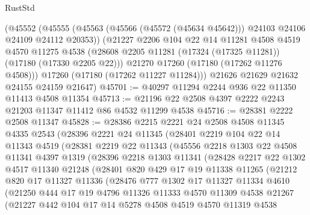 \begin{lexlean}{RustStd}
\begin{coremodule}
      (@45552
        (@45555 (@45563 (@45566 (@45572 (@45634 @45642))) @24103 @24106 @24109 @24112 @20353))
        (@21227
          @2206
          @104
          @22
          @14
          @11281
          @4508
          @4519
          @4570
          @11275
          @4538
          (@28608 @2205 @11281 (@17324 (@17325 @11281)) (@17180 (@17330 @2205 @22)))
          @21270
          @17260
          (@17180 (@17262 @11276 @4508)))
        @17260
        (@17180 (@17262 @11227 @11284)))
      @21626
      @21629
      @21632
      @24155
      @24159
      @21647)
@45701 := @40297 @11294 @2244 @936 @22 @11350 @11413 @4508 @11354
@45713 := @21196 @22 @2508 @4397 @2222 @2243 @21203 @11347 @11412 @86 @4532 @11299 @4538
@45716 := @28381 @2222 @2508 @11347
@45828 := @28386
    @2215
    @2221
    @24
    @2508
    @4508
    @11345
    @4335
    @2543
    (@28396
      @2221
      @24
      @11345
      (@28401
        @2219
        @104
        @22
        @14
        @11343
        @4519
        (@28381
          @2219
          @22
          @11343
          (@45556
            @2218
            @1303
            @22
            @4508
            @11341
            @4397
            @1319
            (@28396
              @2218
              @1303
              @11341
              (@28428
                @2217
                @22
                @1302
                @4517
                @11340
                @21248
                (@28401
                  @820
                  @429
                  @17
                  @19
                  @11338
                  @11265
                  (@21212
                    @820
                    @17
                    @11327
                    @11336
                    (@28476
                      @777
                      @1302
                      @17
                      @11327
                      @11334
                      @4610
                      (@21250
                        @444
                        @17
                        @19
                        @4796
                        @11326
                        @11333
                        @4570
                        @11309
                        @4538
                        @21267
                        (@21227
                          @442
                          @104
                          @17
                          @14
                          @5278
                          @4508
                          @4519
                          @4570
                          @11319
                          @4538

\end{coremodule}
\end{lexlean}
